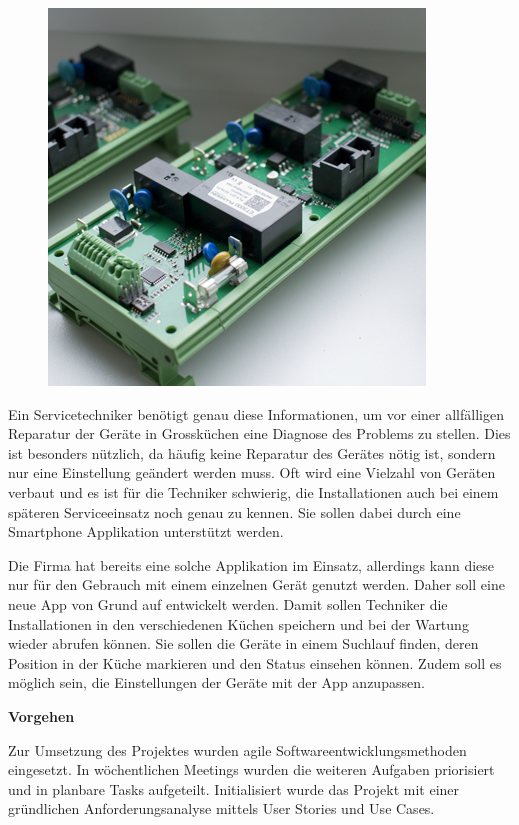 \begin{figure}
	\vspace{-0.5cm}
	\begin{center}
		\includegraphics[scale=1]{start/img/img_7689}
	\end{center}
	\vspace{-0.5cm}
\end{figure}

Ein Servicetechniker benötigt genau diese Informationen, um vor einer allfälligen Reparatur der Geräte in Grossküchen eine Diagnose des Problems zu stellen. Dies ist besonders nützlich, da häufig keine Reparatur des Gerätes nötig ist, sondern nur eine Einstellung geändert werden muss. Oft wird eine Vielzahl von Geräten verbaut und es ist für die Techniker schwierig, die Installationen auch bei einem späteren Serviceeinsatz noch genau zu kennen. Sie sollen dabei durch eine Smartphone Applikation unterstützt werden.

Die Firma hat bereits eine solche Applikation im Einsatz, allerdings kann diese nur für den Gebrauch mit einem einzelnen Gerät genutzt werden. Daher soll eine neue App von Grund auf entwickelt werden. Damit sollen Techniker die Installationen in den verschiedenen Küchen speichern und bei der Wartung wieder abrufen können. Sie sollen die Geräte in einem Suchlauf finden, deren Position in der Küche markieren und den Status einsehen können. Zudem soll es möglich sein, die Einstellungen der Geräte mit der App anzupassen.

\textbf{Vorgehen}

Zur Umsetzung des Projektes wurden agile Softwareentwicklungsmethoden eingesetzt. In  wöchentlichen Meetings wurden die weiteren Aufgaben priorisiert und in planbare Tasks aufgeteilt. Initialisiert wurde das Projekt mit einer gründlichen Anforderungsanalyse mittels User Stories und Use Cases. 

